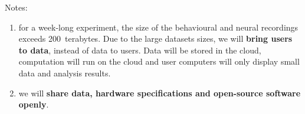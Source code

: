 \documentclass{article}
\begin{document}
Notes:

\begin{enumerate}

    \item for a week-long experiment, the size of the behavioural and neural
        recordings exceeds 200~terabytes. Due to the large datasets sizes,
        we will \textbf{bring users to data}, instead of data to users.
        Data will be stored in the cloud, computation will run on the cloud
        and user computers will only display small data and analysis
        results.

    \item we will \textbf{share data, hardware specifications and
        open-source software openly}.

\end{enumerate}
\end{document}
